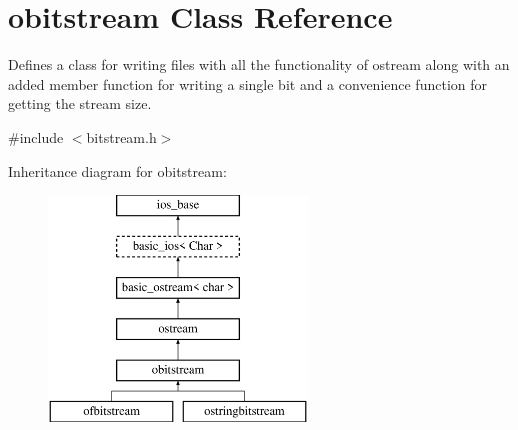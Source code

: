 \hypertarget{classobitstream}{}\section{obitstream Class Reference}
\label{classobitstream}


Defines a class for writing files with all the functionality of ostream along with an added member function for writing a single bit and a convenience function for getting the stream size.  




{\ttfamily \#include $<$bitstream.\+h$>$}

Inheritance diagram for obitstream\+:\begin{figure}[H]
\begin{center}
\leavevmode
\includegraphics[height=6.000000cm]{classobitstream}
\end{center}
\end{figure}
